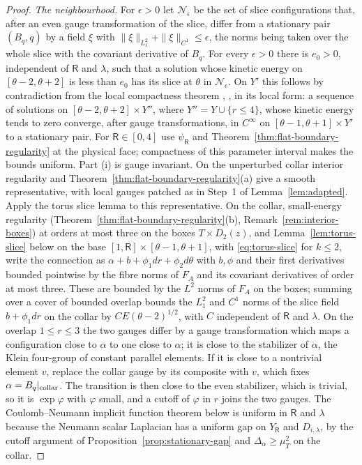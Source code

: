\documentclass[11pt]{amsart}
\theoremstyle{definition}
\theoremstyle{remark}
\theoremstyle{plain}
\numberwithin{equation}{section}
\begin{document}
\begin{proof}
\emph{The neighbourhood.} For $\epsilon>0$ let $\mathcal N_\epsilon$ be the set of slice
configurations that, after an even gauge transformation of the slice, differ from a
stationary pair $(B_q,q)$ by a field $\xi$ with $\|\xi\|_{L^2_1}+\|\xi\|_{C^1}\le\epsilon$, the norms
being taken over the whole slice with the covariant derivative of $B_q$. For every $\epsilon>0$
there is $e_0>0$, independent of $\mathsf R$ and $\lambda$, such that a solution whose kinetic
energy on $[\theta-2,\theta+2]$ is less than $e_0$ has its slice at $\theta$ in $\mathcal N_\epsilon$. On
$Y'$ this follows by contradiction from the local compactness theorem
\cite[Theorem~5.2]{DFL}, \cite[Theorem~3]{DFL-mixed}, in its local form: a sequence of
solutions on $[\theta-2,\theta+2]\times Y''$, where
$Y''=Y\cup\{r\le4\}$, whose kinetic energy tends to zero converge,
after gauge transformations, in $C^\infty$ on
$[\theta-1,\theta+1]\times Y'$ to a stationary pair. For
$\mathsf R\in[0,4]$ use $\psi_\mathsf R$ and
Theorem~\ref{thm:flat-boundary-regularity} at the physical face;
compactness of this parameter interval makes the bounds uniform.
Part (i) is gauge invariant. On the unperturbed collar interior
regularity and Theorem~\ref{thm:flat-boundary-regularity}(a) give
a smooth representative, with local gauges patched as in Step~1
of Lemma~\ref{lem:adapted}. Apply the torus slice lemma to this
representative. On the collar,
small-energy regularity (Theorem~\ref{thm:flat-boundary-regularity}(b),
Remark~\ref{rem:interior-boxes}) at orders at most three on the boxes $T\times D_2(z)$, and
Lemma~\ref{lem:torus-slice} below on the base $[1,\mathsf R]\times[\theta-1,\theta+1]$, with
\eqref{eq:torus-slice} for $k\le2$, write the connection as $\alpha+b+\phi_1dr+\phi_2d\theta$ with
$b,\phi$ and their first derivatives bounded pointwise by the fibre norms of $F_A$ and its
covariant derivatives of order at most three. These are bounded by the $L^2$ norms of $F_A$ on
the boxes; summing over a cover of bounded overlap bounds the $L^2_1$ and $C^1$ norms of the
slice field $b+\phi_1dr$ on the collar by $CE(\theta-2)^{1/2}$, with $C$ independent of $\mathsf R$
and $\lambda$. On the overlap $1\le r\le3$ the two gauges differ by a gauge
transformation which maps a configuration close to $\alpha$ to one close to $\alpha$; it is
close to the stabilizer of $\alpha$, the Klein four-group of constant parallel elements. If
it is close to a nontrivial element $v$, replace the collar gauge by its composite with
$v$, which fixes $\alpha=B_q|_{\rm collar}$. The transition is then close to the even
stabilizer, which is trivial, so it is $\exp\varphi$ with $\varphi$ small, and a cutoff of
$\varphi$ in $r$ joins the two gauges. The Coulomb--Neumann implicit function theorem
below is uniform in $\mathsf R$ and $\lambda$ because the Neumann scalar Laplacian has a
uniform gap on $Y_{\mathsf R}$ and $D_{i,\lambda}$, by the cutoff argument of
Proposition~\ref{prop:stationary-gap} and $\Delta_\alpha\ge\mu_T^2$ on the collar.


\end{proof}
\end{document}
